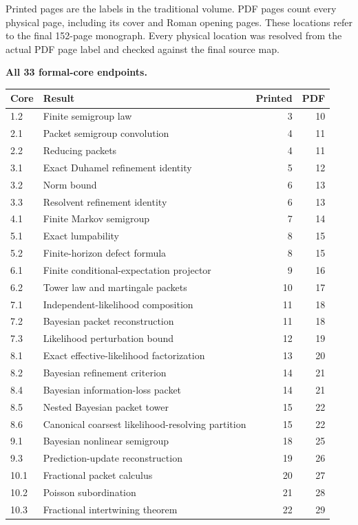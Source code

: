 Printed pages are the labels in the traditional volume. PDF pages count every physical page, including its cover and Roman opening pages. These locations refer to the final 152-page monograph. Every physical location was resolved from the actual PDF page label and checked against the final source map.

\textbf{All 33 formal-core endpoints.}
\begin{longtable}{@{}p{.12\linewidth}p{.61\linewidth}rr@{}}\toprule Core & Result & Printed & PDF\\\midrule\endhead
1.2 & Finite semigroup law & 3 & 10\\
2.1 & Packet semigroup convolution & 4 & 11\\
2.2 & Reducing packets & 4 & 11\\
3.1 & Exact Duhamel refinement identity & 5 & 12\\
3.2 & Norm bound & 6 & 13\\
3.3 & Resolvent refinement identity & 6 & 13\\
4.1 & Finite Markov semigroup & 7 & 14\\
5.1 & Exact lumpability & 8 & 15\\
5.2 & Finite-horizon defect formula & 8 & 15\\
6.1 & Finite conditional-expectation projector & 9 & 16\\
6.2 & Tower law and martingale packets & 10 & 17\\
7.1 & Independent-likelihood composition & 11 & 18\\
7.2 & Bayesian packet reconstruction & 11 & 18\\
7.3 & Likelihood perturbation bound & 12 & 19\\
8.1 & Exact effective-likelihood factorization & 13 & 20\\
8.2 & Bayesian refinement criterion & 14 & 21\\
8.4 & Bayesian information-loss packet & 14 & 21\\
8.5 & Nested Bayesian packet tower & 15 & 22\\
8.6 & Canonical coarsest likelihood-resolving partition & 15 & 22\\
9.1 & Bayesian nonlinear semigroup & 18 & 25\\
9.3 & Prediction-update reconstruction & 19 & 26\\
10.1 & Fractional packet calculus & 20 & 27\\
10.2 & Poisson subordination & 21 & 28\\
10.3 & Fractional intertwining theorem & 22 & 29\\

\end{longtable}
